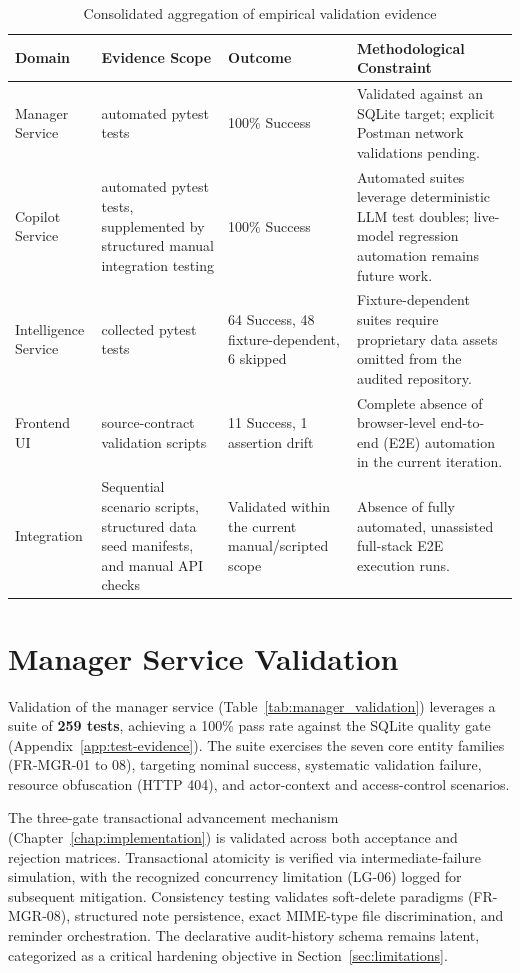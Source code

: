 \begin{table}[H]
\centering
\scriptsize
\renewcommand{\arraystretch}{1.3}
\begin{tabularx}{\textwidth}{|p{2.4cm}|>{\RaggedRight\arraybackslash}X|p{3cm}|>{\RaggedRight\arraybackslash}X|}
\hline
\rowcolor{lightgray}
\textbf{Domain} & \textbf{Evidence Scope} & \textbf{Outcome} & \textbf{Methodological Constraint} \\ \hline
Manager Service & 259 automated pytest tests & 100\% Success & Validated against an SQLite target; explicit Postman network validations pending. \\ \hline
Copilot Service & 636 automated pytest tests, supplemented by structured manual integration testing & 100\% Success & Automated suites leverage deterministic LLM test doubles; live-model regression automation remains future work. \\ \hline
Intelligence Service & 118 collected pytest tests & 64 Success, 48 fixture-dependent, 6 skipped & Fixture-dependent suites require proprietary data assets omitted from the audited repository. \\ \hline
Frontend UI & 12 source-contract validation scripts & 11 Success, 1 assertion drift & Complete absence of browser-level end-to-end (E2E) automation in the current iteration. \\ \hline
Integration & Sequential scenario scripts, structured data seed manifests, and manual API checks & Validated within the current manual/scripted scope & Absence of fully automated, unassisted full-stack E2E execution runs. \\ \hline
\end{tabularx}
\caption{Consolidated aggregation of empirical validation evidence}
\label{tab:validation_summary}
\end{table}

\section{Manager Service Validation}
Validation of the manager service (Table~\ref{tab:manager_validation}) leverages a suite of \textbf{259 tests}, achieving a 100\% pass rate against the SQLite quality gate (Appendix~\ref{app:test-evidence}). The suite exercises the seven core entity families (FR-MGR-01 to 08), targeting nominal success, systematic validation failure, resource obfuscation (HTTP 404), and actor-context and access-control scenarios. 

The three-gate transactional advancement mechanism (Chapter~\ref{chap:implementation}) is validated across both acceptance and rejection matrices. Transactional atomicity is verified via intermediate-failure simulation, with the recognized concurrency limitation (LG-06) logged for subsequent mitigation. Consistency testing validates soft-delete paradigms (FR-MGR-08), structured note persistence, exact MIME-type file discrimination, and reminder orchestration. The declarative audit-history schema remains latent, categorized as a critical hardening objective in Section~\ref{sec:limitations}.

